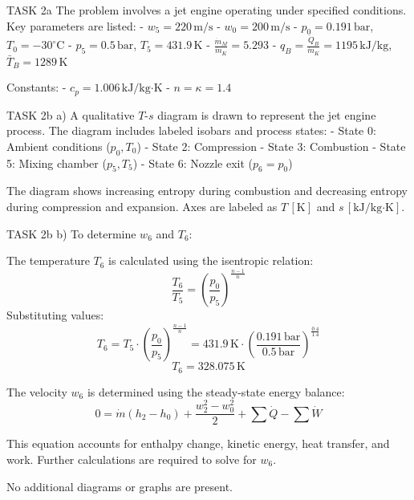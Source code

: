 TASK 2a  
The problem involves a jet engine operating under specified conditions. Key parameters are listed:  
- \( w_5 = 220 \, \text{m/s} \)  
- \( w_0 = 200 \, \text{m/s} \)  
- \( p_0 = 0.191 \, \text{bar} \), \( T_0 = -30^\circ\text{C} \)  
- \( p_5 = 0.5 \, \text{bar} \), \( T_5 = 431.9 \, \text{K} \)  
- \( \frac{\dot{m}_M}{\dot{m}_K} = 5.293 \)  
- \( q_B = \frac{\dot{Q}_B}{\dot{m}_K} = 1195 \, \text{kJ/kg} \), \( \bar{T}_B = 1289 \, \text{K} \)  

Constants:  
- \( c_p = 1.006 \, \text{kJ/kg·K} \)  
- \( n = \kappa = 1.4 \)  

TASK 2b  
a) A qualitative \( T \)-\( s \) diagram is drawn to represent the jet engine process. The diagram includes labeled isobars and process states:  
- State 0: Ambient conditions (\( p_0, T_0 \))  
- State 2: Compression  
- State 3: Combustion  
- State 5: Mixing chamber (\( p_5, T_5 \))  
- State 6: Nozzle exit (\( p_6 = p_0 \))  

The diagram shows increasing entropy during combustion and decreasing entropy during compression and expansion. Axes are labeled as \( T \, [\text{K}] \) and \( s \, [\text{kJ/kg·K}] \).  

TASK 2b  
b) To determine \( w_6 \) and \( T_6 \):  

The temperature \( T_6 \) is calculated using the isentropic relation:  
\[
\frac{T_6}{T_5} = \left( \frac{p_0}{p_5} \right)^{\frac{n-1}{n}}
\]  
Substituting values:  
\[
T_6 = T_5 \cdot \left( \frac{p_0}{p_5} \right)^{\frac{n-1}{n}} = 431.9 \, \text{K} \cdot \left( \frac{0.191 \, \text{bar}}{0.5 \, \text{bar}} \right)^{\frac{0.4}{1.4}}
\]  
\[
T_6 = 328.075 \, \text{K}
\]  

The velocity \( w_6 \) is determined using the steady-state energy balance:  
\[
0 = \dot{m} \left( h_2 - h_0 \right) + \frac{w_2^2 - w_0^2}{2} + \sum \dot{Q} - \sum \dot{W}
\]  

This equation accounts for enthalpy change, kinetic energy, heat transfer, and work. Further calculations are required to solve for \( w_6 \).  

No additional diagrams or graphs are present.